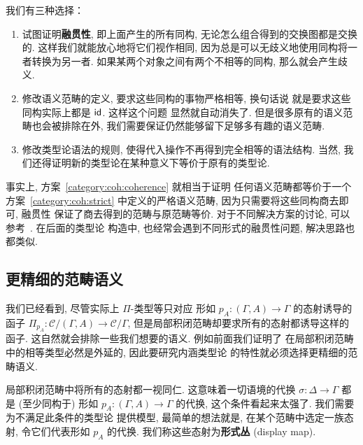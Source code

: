 我们有三种选择：
\begin{enumerate}
\item\label{category:coh:coherence} 试图证明\textbf{融贯性},
即上面产生的所有同构, 无论怎么组合得到的交换图都是交换的.
这样我们就能放心地将它们视作相同,
因为总是可以无歧义地使用同构将一者转换为另一者.
如果某两个对象之间有两个不相等的同构, 那么就会产生歧义.
\item\label{category:coh:strict} 修改语义范畴的定义,
要求这些同构的事物严格相等, 换句话说
就是要求这些同构实际上都是 \(\textnormal{\textsf{id}}\). 这样这个问题
显然就自动消失了. 但是很多原有的语义范畴也会被排除在外,
我们需要保证仍然能够留下足够多有趣的语义范畴.
\item\label{category:coh:weak} 修改类型论语法的规则,
使得代入操作不再得到完全相等的语法结构. 当然,
我们还得证明新的类型论在某种意义下等价于原有的类型论.
\end{enumerate}
事实上, 方案~\ref{category:coh:coherence} 就相当于证明
任何语义范畴都等价于一个方案~\ref{category:coh:strict}
中定义的严格语义范畴, 因为只需要将这些同构商去即可, 融贯性
保证了商去得到的范畴与原范畴等价. 对于不同解决方案的讨论,
可以参考~\cite{curien:2014:revisit}. 在后面的类型论
构造中, 也经常会遇到不同形式的融贯性问题, 解决思路也都类似.

\subsection{更精细的范畴语义}
我们已经看到, 尽管实际上 \(\Pi\)-类型等只对应
形如 \(p_A : (\Gamma, A) \to \Gamma\) 的态射诱导的
函子 \(\Pi_{p_A} : \mathcal C/(\Gamma, A) \to \mathcal C/\Gamma\),
但是局部积闭范畴却要求所有的态射都诱导这样的函子.
这自然就会排除一些我们想要的语义. 例如前面我们证明了
在局部积闭范畴中的相等类型必然是外延的, 因此要研究内涵类型论
的特性就必须选择更精细的范畴语义.

局部积闭范畴中将所有的态射都一视同仁.
这意味着一切语境的代换 \(\sigma : \Delta \to \Gamma\)
都是 (至少同构于) 形如 \(p_A : (\Gamma, A) \to \Gamma\)
的代换, 这个条件看起来太强了. 我们需要为不满足此条件的类型论
提供模型, 最简单的想法就是, 在某个范畴中选定一族态射,
令它们代表形如 \(p_A\) 的代换.
我们称这些态射为\textbf{形式丛} (display map).

